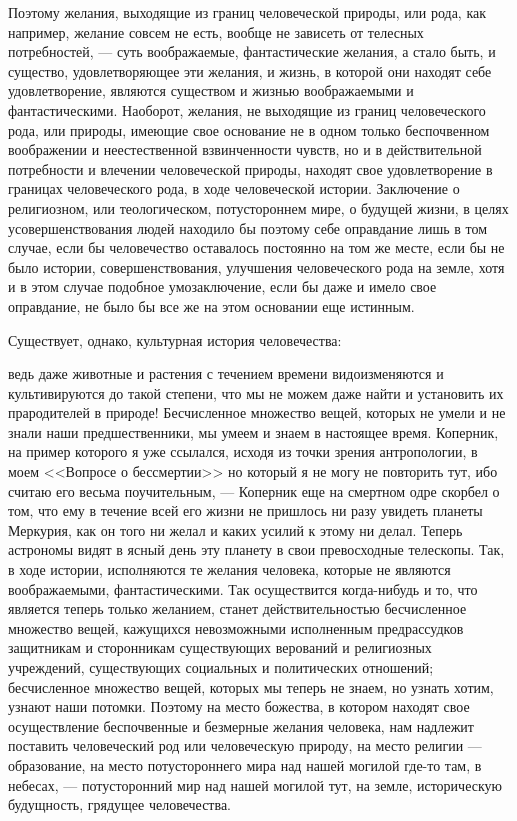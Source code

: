 \documentclass[12pt]{article}
\begin{document}
Поэтому желания, выходящие из границ человеческой природы, или рода, как например, желание совсем не есть, вообще не зависеть от телесных потребностей, --- суть воображаемые, фантастические желания, а стало быть, и существо, удовлетворяющее эти желания, и жизнь, в которой они находят себе удовлетворение, являются существом и жизнью воображаемыми и фантастическими. Наоборот, желания, не выходящие из границ человеческого рода, или природы, имеющие свое основание не в одном только беспочвенном воображении и неестественной взвинченности чувств, но и в действительной потребности и влечении человеческой природы, находят свое удовлетворение в границах человеческого рода, в ходе человеческой истории. Заключение о религиозном, или теологическом, потустороннем мире, о будущей жизни, в целях усовершенствования людей находило бы поэтому себе оправдание лишь в том случае, если бы человечество оставалось постоянно на том же месте, если бы не было истории, совершенствования, улучшения человеческого рода на земле, хотя и в этом случае подобное умозаключение, если бы даже и имело свое оправдание, не было бы все же на этом основании еще истинным. 

Существует, однако, культурная история человечества: 

ведь даже животные и растения с течением времени видоизменяются и культивируются до такой степени, что мы не можем даже найти и установить их прародителей в природе! Бесчисленное множество вещей, которых не умели и не знали наши предшественники, мы умеем и знаем в настоящее время. Коперник, на пример которого я уже ссылался, исходя из точки зрения антропологии, в моем <<Вопросе о бессмертии>>  но который я не могу не повторить тут, ибо считаю его весьма поучительным, --- Коперник еще на смертном одре скорбел о том, что ему в течение всей его жизни не пришлось ни разу увидеть планеты Меркурия, как он того ни желал и каких усилий к этому ни делал. Теперь астрономы видят в ясный день эту планету в свои превосходные телескопы. Так, в ходе истории, исполняются те желания человека, которые не являются воображаемыми, фантастическими. Так осуществится когда-нибудь и то, что является теперь только желанием, станет действительностью бесчисленное множество вещей, кажущихся невозможными исполненным предрассудков защитникам и сторонникам существующих верований и религиозных учреждений, существующих социальных и политических отношений; бесчисленное множество вещей, которых мы теперь не знаем, но узнать хотим, узнают наши потомки. Поэтому на место божества, в котором находят свое осуществление беспочвенные и безмерные желания человека, нам надлежит поставить человеческий род или человеческую природу, на место религии --- образование, на место потустороннего мира над нашей могилой где-то там, в небесах, --- потусторонний мир над нашей могилой тут, на земле, историческую будущность, грядущее человечества. 
\end{document}

